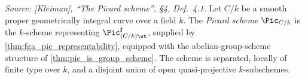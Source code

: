 \begin{definition}
  \label{def:pic_scheme}

  \textit{Source: [Kleiman], ``The Picard scheme'', \S 4, Def.~4.1.}
  Let \(C/k\) be a smooth proper geometrically integral curve over a field
  \(k\). The \emph{Picard scheme} \(\Pic_{C/k}\) is the \(k\)-scheme representing
  \(\Pic^\sharp_{(C/k)\et}\), supplied by
  \cref{thm:fga_pic_representability}, equipped with the abelian-group-scheme
  structure of \cref{thm:pic_is_group_scheme}. The scheme is separated,
  locally of finite type over \(k\), and a disjoint union of open
  quasi-projective \(k\)-subschemes.
\end{definition}

